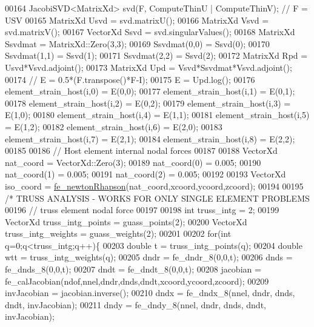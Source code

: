 \begin{DoxyCode}
00164         JacobiSVD<MatrixXd> svd(F, ComputeThinU | ComputeThinV); \textcolor{comment}{// F = USV}
00165         MatrixXd Usvd = svd.matrixU();
00166         MatrixXd Vsvd = svd.matrixV();
00167         VectorXd Ssvd = svd.singularValues();
00168         MatrixXd Ssvdmat = MatrixXd::Zero(3,3);
00169         Ssvdmat(0,0) = Ssvd(0);
00170         Ssvdmat(1,1) = Ssvd(1);
00171         Ssvdmat(2,2) = Ssvd(2);
00172         MatrixXd Rpd = Usvd*Vsvd.adjoint();
00173         MatrixXd Upd = Vsvd*Ssvdmat*Vsvd.adjoint();
00174         \textcolor{comment}{// E = 0.5*(F.transpose()*F-I);}
00175         E = Upd.log();
00176         element\_strain\_host(i,0) = E(0,0);
00177         element\_strain\_host(i,1) = E(0,1);
00178         element\_strain\_host(i,2) = E(0,2);
00179         element\_strain\_host(i,3) = E(1,0);
00180         element\_strain\_host(i,4) = E(1,1);
00181         element\_strain\_host(i,5) = E(1,2);
00182         element\_strain\_host(i,6) = E(2,0);
00183         element\_strain\_host(i,7) = E(2,1);
00184         element\_strain\_host(i,8) = E(2,2);
00185 
00186         \textcolor{comment}{// Host element internal nodal forces}
00187 
00188         VectorXd nat\_coord = VectorXd::Zero(3);
00189         nat\_coord(0) = 0.005;
00190         nat\_coord(1) = 0.005;
00191         nat\_coord(2) = 0.005;
00192 
00193         VectorXd iso\_coord = \hyperlink{functions_8h_acdc9c3b5b3aecd9972c84d0cbb669978}{fe\_newtonRhapson}(nat\_coord,xcoord,ycoord,zcoord);
00194 
00195     \textcolor{comment}{/* TRUSS ANALYSIS - WORKS FOR ONLY SINGLE ELEMENT PROBLEMS}
00196 \textcolor{comment}{    // truss element nodal force}
00197 \textcolor{comment}{}
00198 \textcolor{comment}{    int truss\_intg = 2;}
00199 \textcolor{comment}{    VectorXd truss\_intg\_points = guass\_points(2);}
00200 \textcolor{comment}{    VectorXd truss\_intg\_weights = guass\_weights(2);}
00201 \textcolor{comment}{}
00202 \textcolor{comment}{    for(int q=0;q<truss\_intg;q++)\{}
00203 \textcolor{comment}{        double t = truss\_intg\_points(q);}
00204 \textcolor{comment}{        double wtt = truss\_intg\_weights(q);}
00205 \textcolor{comment}{        dndr = fe\_dndr\_8(0,0,t);}
00206 \textcolor{comment}{        dnds = fe\_dnds\_8(0,0,t);}
00207 \textcolor{comment}{        dndt = fe\_dndt\_8(0,0,t);}
00208 \textcolor{comment}{        jacobian = fe\_calJacobian(ndof,nnel,dndr,dnds,dndt,xcoord,ycoord,zcoord);}
00209 \textcolor{comment}{        invJacobian = jacobian.inverse();}
00210 \textcolor{comment}{        dndx = fe\_dndx\_8(nnel, dndr, dnds, dndt, invJacobian);}
00211 \textcolor{comment}{        dndy = fe\_dndy\_8(nnel, dndr, dnds, dndt, invJacobian);}

\end{DoxyCode}

